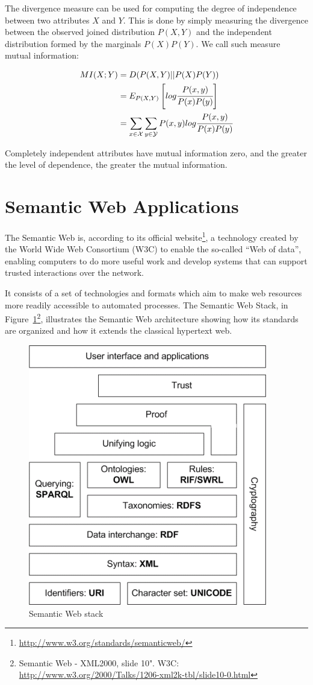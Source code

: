 The divergence measure can be used for computing the degree of independence between two attributes $X$ and $Y$. This
is
done by simply measuring the divergence between the observed joined distribution $P(X,Y)$ and the independent
distribution formed by the marginals $P(X)P(Y)$. We call such measure mutual information:

\begin{equation} \label{eq:mutualInformation}
\begin{split}
 MI(X;Y)&=D(P(X,Y)||P(X)P(Y)) \\
 &=E_{P(X,Y)}\left[ log\cfrac{P(x,y)}{P(x)P(y)} \right] \\
 &=\sum_{x \in \mathcal{X}} \sum_{y \in \mathcal{Y}} P(x,y)log\cfrac{P(x,y)}{P(x)P(y)}
\end{split}
\end{equation}

Completely independent attributes have mutual information zero, and the greater the level of dependence, the greater
the mutual information.

\section{Semantic Web Applications}
\label{sec:rw-semanticWeb}

The Semantic Web is, according to its official website\footnote{\url{http://www.w3.org/standards/semanticweb/}}, a
technology created by the World Wide Web Consortium (W3C) to enable the so-called ``Web of data'', enabling computers
to do more useful work and develop systems that can support trusted interactions over the network. 

It consists of a set of technologies and formats which aim to make web resources more readily accessible to automated
processes. The Semantic Web Stack, in Figure~\ref{fig:sematicWebLayer}\footnote{Semantic Web - XML2000, slide 10".
W3C: \url{http://www.w3.org/2000/Talks/1206-xml2k-tbl/slide10-0.html}}, illustrates the Semantic Web architecture
showing how its standards are organized and how it extends the classical hypertext web.

\begin{figure}
\begin{center}
  \includegraphics[width=0.5\linewidth]{./Figures/Semantic-web-stack.png}
\end{center}
\caption{Semantic Web stack}
\label{fig:sematicWebLayer}
\end{figure}

